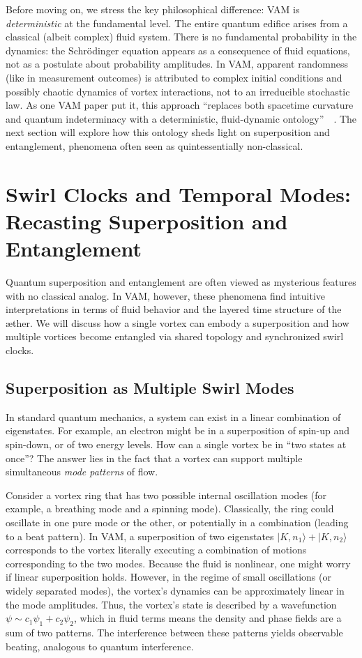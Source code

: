\documentclass[a4paper,12pt]{article}
\begin{document}
    Before moving on, we stress the key philosophical difference: VAM is \emph{deterministic} at the fundamental level. The entire quantum edifice arises from a classical (albeit complex) fluid system. There is no fundamental probability in the dynamics: the Schrödinger equation appears as a consequence of fluid equations, not as a postulate about probability amplitudes. In VAM, apparent randomness (like in measurement outcomes) is attributed to complex initial conditions and possibly chaotic dynamics of vortex interactions, not to an irreducible stochastic law. As one VAM paper put it, this approach “replaces both spacetime curvature and quantum indeterminacy with a deterministic, fluid-dynamic ontology”~\cite{reference_94}~\cite{reference_95}. The next section will explore how this ontology sheds light on superposition and entanglement, phenomena often seen as quintessentially non-classical.

\section{Swirl Clocks and Temporal Modes: Recasting Superposition and Entanglement}
    Quantum superposition and entanglement are often viewed as mysterious features with no classical analog. In VAM, however, these phenomena find intuitive interpretations in terms of fluid behavior and the layered time structure of the æther. We will discuss how a single vortex can embody a superposition and how multiple vortices become entangled via shared topology and synchronized swirl clocks.

    \subsection{Superposition as Multiple Swirl Modes}
    In standard quantum mechanics, a system can exist in a linear combination of eigenstates. For example, an electron might be in a superposition of spin-up and spin-down, or of two energy levels. How can a single vortex be in “two states at once”? The answer lies in the fact that a vortex can support multiple simultaneous \emph{mode patterns} of flow.

    Consider a vortex ring that has two possible internal oscillation modes (for example, a breathing mode and a spinning mode). Classically, the ring could oscillate in one pure mode or the other, or potentially in a combination (leading to a beat pattern). In VAM, a superposition of two eigenstates $|K, n_1\rangle + |K, n_2\rangle$ corresponds to the vortex literally executing a combination of motions corresponding to the two modes. Because the fluid is nonlinear, one might worry if linear superposition holds. However, in the regime of small oscillations (or widely separated modes), the vortex’s dynamics can be approximately linear in the mode amplitudes. Thus, the vortex’s state is described by a wavefunction $\psi \sim c_1 \psi_1 + c_2 \psi_2$, which in fluid terms means the density and phase fields are a sum of two patterns. The interference between these patterns yields observable beating, analogous to quantum interference.
\end{document}

